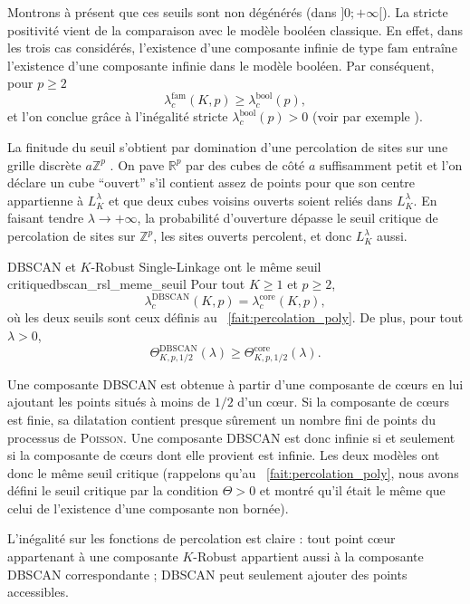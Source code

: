 \begin{Preuve}
Montrons à présent que ces seuils sont non dégénérés (dans $]0 ; + \infty[$). La stricte positivité vient de la comparaison avec le modèle booléen classique. En effet, dans les trois cas considérés, l'existence d'une composante infinie de type $\mathrm{fam}$ entraîne l'existence d'une composante infinie dans le modèle booléen. Par conséquent, pour $p\ge 2$
\[
\lambda^{\mathrm{fam}}_{c}(K,p)
\geq
\lambda^{\mathrm{bool}}_{c}(p),
\]
et l'on conclue grâce à l'inégalité stricte $\lambda^{\mathrm{bool}}_{c}(p)>0$ (voir par exemple \cite{penrose2003,MeesterRoy}).

La finitude du seuil s'obtient par domination d'une percolation de sites \cite{Percolation2006} sur une grille discrète $a \mathbb Z^p$ . On pave $\mathbb R^p$ par des cubes de côté $a$ suffisamment petit et l’on déclare un cube ``ouvert'' s’il contient assez de points pour que son centre appartienne à $L_K^\lambda$ et que deux cubes voisins ouverts soient reliés dans $L_K^\lambda$. En faisant tendre $\lambda \to +\infty$, la probabilité d’ouverture dépasse le seuil critique de percolation de sites sur $\mathbb Z^p$, les sites ouverts percolent, et donc $L_K^\lambda$ aussi.

\end{Preuve}

\begin{Fait}{DBSCAN et $K$-Robust Single-Linkage ont le même seuil critique}{dbscan_rsl_meme_seuil}
Pour tout $K\geq 1$ et $p\geq 2$,
\[
\lambda^{\mathrm{DBSCAN}}_{c}(K,p)
=
\lambda^{\mathrm{core}}_{c}(K,p),
\]
où les deux seuils sont ceux définis au \Fact~\ref{fait:percolation_poly}. 
De plus, pour tout $\lambda>0$,
\[
\Theta^{\mathrm{DBSCAN}}_{K,p,1/2}(\lambda)
\geq
\Theta^{\mathrm{core}}_{K,p,1/2}(\lambda).
\]
\end{Fait}

\begin{Preuve}
Une composante DBSCAN est obtenue à partir d'une composante de cœurs en lui ajoutant les points situés à moins de $1/2$ d'un cœur. Si la composante de cœurs est finie, sa dilatation contient presque sûrement un nombre fini de points du processus de \textsc{Poisson}. Une composante DBSCAN est donc infinie si et seulement si la composante de cœurs dont elle provient est infinie. Les deux modèles ont donc le même seuil critique (rappelons qu'au \Fact~\ref{fait:percolation_poly}, nous avons défini le seuil critique par la condition $\Theta>0$ et montré qu'il était le même que celui de l'existence d'une composante non bornée).

L'inégalité sur les fonctions de percolation est claire : tout point cœur appartenant à une composante $K$-Robust appartient aussi à la composante DBSCAN correspondante ; DBSCAN peut seulement ajouter des points accessibles.
\end{Preuve}


